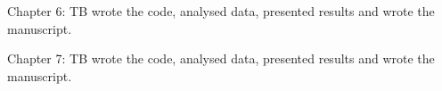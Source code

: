 \documentclass[
]{book}
\begin{document}
Chapter 6: TB wrote the code, analysed data, presented results and wrote the manuscript.

Chapter 7: TB wrote the code, analysed data, presented results and wrote the manuscript.

  
\end{document}
